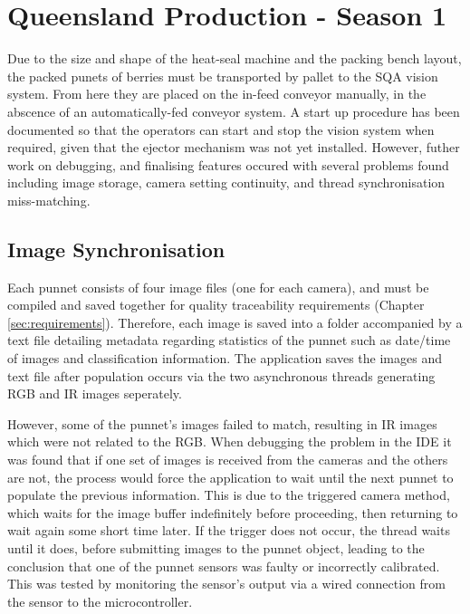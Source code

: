 \documentclass[fleqn,twoside,12pt]{report}
\begin{document}
\section{Queensland Production - Season 1}

Due to the size and shape of the heat-seal machine and the packing bench layout, the packed punets of berries must be transported by pallet to the SQA vision system. From here they are placed on the in-feed conveyor manually, in the abscence of an automatically-fed conveyor system. A start up procedure has been documented so that the operators can start and stop the vision system when required, given that the ejector mechanism was not yet installed. However, futher work on debugging, and finalising features occured with several problems found including image storage, camera setting continuity, and thread synchronisation miss-matching. 



\subsection{Image Synchronisation}

Each punnet consists of four image files (one for each camera), and must be compiled and saved together for quality traceability requirements (Chapter \ref{sec:requirements}). Therefore, each image is saved into a folder accompanied by a text file detailing metadata regarding statistics of the punnet such as date/time of images and classification information. The application saves the images and text file after population occurs via the two asynchronous threads generating RGB and IR images seperately. 

However, some of the punnet's images failed to match, resulting in IR images which were not related to the RGB. When debugging the problem in the IDE it was found that if one set of images is received from the cameras and the others are not, the process would force the application to wait until the next punnet to populate the previous information. This is due to the triggered camera method, which waits for the image buffer indefinitely before proceeding, then returning to wait again some short time later. If the trigger does not occur, the thread waits until it does, before submitting images to the punnet object, leading to the conclusion that one of the punnet sensors was faulty or incorrectly calibrated. This was tested by monitoring the sensor's output via a wired connection from the sensor to the microcontroller. 
\end{document}
